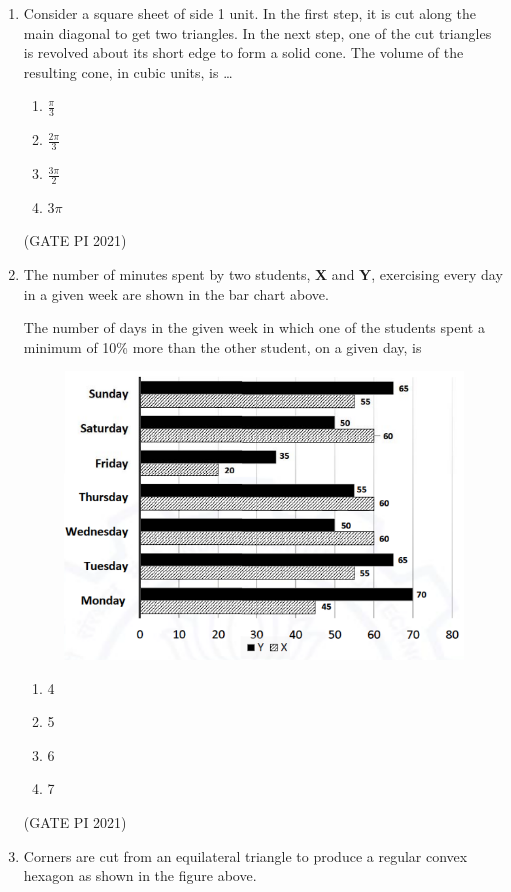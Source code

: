 \documentclass[journal,12pt,onecolumn]{IEEEtran}
\theoremstyle{remark}
\begin{document}
\begin{enumerate}
\item
Consider a square sheet of side 1 unit. In the first step, it is cut along the main diagonal to get two triangles. In the next step, one of the cut triangles is revolved about its short edge to form a solid cone. The volume of the resulting cone, in cubic units, is \ldots
\begin{multicols}{4}
\begin{enumerate}
\item $\frac{\pi}{3}$
\item $\frac{2\pi}{3}$
\item $\frac{3\pi}{2}$
\item $3\pi$
\end{enumerate}
\end{multicols}
\hfill (GATE PI 2021)


 \item The number of minutes spent by two students, \textbf{X} and \textbf{Y}, exercising every day in a given week are shown in the bar chart above.\

The number of days in the given week in which one of the students spent a minimum of 10\% more than the other student, on a given day, is

\begin{figure}[H]
    \centering
    \includegraphics[width=0.5\columnwidth]{figs/fig2.png}
    \caption{}
    \label{fig:placeholder}
\end{figure} 


\begin{multicols}{4}
\begin{enumerate}
\item 4
\item 5
\item 6
\item 7
\end{enumerate}
\end{multicols}

\hfill (GATE PI 2021)

\item
Corners are cut from an equilateral triangle to produce a regular convex hexagon as shown in the figure above.


\end{enumerate}
\end{document}
